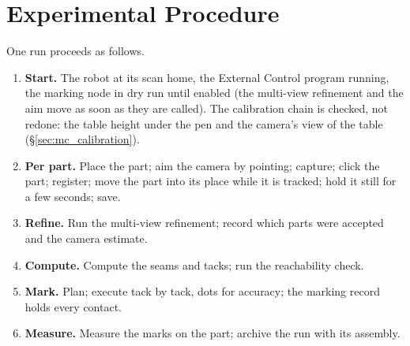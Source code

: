 \section{Experimental Procedure}
\label{sec:setup_procedure}
One run proceeds as follows.
\begin{enumerate}
\item \textbf{Start.} The robot at its scan home, the External Control program running, the marking
  node in dry run until enabled (the multi-view refinement and the aim move as soon as they are
  called). The calibration chain is checked, not redone: the table height
  under the pen and the camera's view of the table (\S\ref{sec:mc_calibration}).
\item \textbf{Per part.} Place the part; aim the camera by pointing; capture; click the part;
  register; move the part into its place while it is tracked; hold it still for a few seconds; save.
\item \textbf{Refine.} Run the multi-view refinement; record which parts were accepted and the
  camera estimate.
\item \textbf{Compute.} Compute the seams and tacks; run the reachability check.
\item \textbf{Mark.} Plan; execute tack by tack, dots for accuracy; the marking record holds every
  contact.
\item \textbf{Measure.} Measure the marks on the part; archive the run with its assembly.
\end{enumerate}

